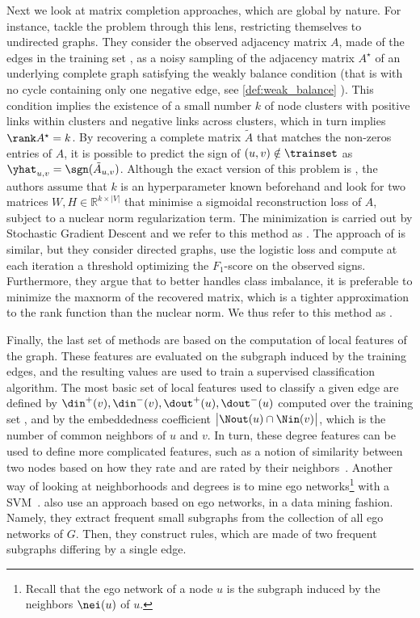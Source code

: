 \begin{newcontent}
Next we look at matrix completion approaches, which are global by nature.
For instance, \Textcite{LowRankCompletion14} tackle the \esp{} problem through this lens,
restricting themselves to undirected graphs. They consider the
observed adjacency matrix $A$, made of the edges in the training set \trainset{}, as a noisy
sampling of the adjacency matrix $A^\star$ of an underlying complete graph satisfying the weakly
balance condition (that is with no cycle containing only one negative edge, see
\autoref{def:weak_balance} ).
This condition implies the existence of a small number $k$ of node clusters with positive links
within clusters and negative links across clusters, which in turn implies $\rank A^\star=k$.  By
recovering a complete matrix $\tilde{A}$ that matches the non-zeros entries of $A$, it is possible
to predict the sign of $(u,v) \notin \trainset$ as $\yhat_{u,v} = \sgn(\tilde{A}_{u,v})$. Although
the exact version of this problem is \NPh{}, the authors assume that $k$ is an hyperparameter known
beforehand and look for two matrices $W,H\in \mathbb{R}^{k\times|V|}$ that minimise a sigmoidal
reconstruction loss of $A$, subject to a nuclear norm regularization term. The minimization is
carried out by Stochastic Gradient Descent and we refer to this method as \emph{\complowrank{}}.
The approach of \textcite{OnlineCompletion17} is similar, but they consider directed graphs, use the
logistic loss and compute at each iteration a threshold optimizing the $F_1$-score on the observed
signs. Furthermore, they argue that to better handles class imbalance, it is preferable to minimize
the maxnorm of the recovered matrix, which is a tighter approximation to the rank function than the
nuclear norm. We thus refer to this method as \compmaxnorm{}.

\medskip

Finally, the last set of methods
are based on the computation of local features of the graph. These features are
evaluated on the subgraph induced by the training edges, and the resulting values are used to train
a supervised classification algorithm. The most basic set of local
features used to classify a given edge \euv{} are defined by
$\din^+(v),\din^-(v),\dout^+(u),\dout^-(u)$ computed over the training set \trainset{}, and by the
embeddedness coefficient $\big|\Nout(u) \cap \Nin(v)\big|$, which is the number of
common neighbors of $u$ and $v$. In turn, these degree features can be used to define more
complicated features, such as a notion of similarity between two nodes based on how they rate and
are rated by their neighbors~\autocite{Yuan2017}.
Another way of looking at neighborhoods and degrees is to mine ego networks\footnote{Recall that the
ego network of a node $u$ is the subgraph induced by the neighbors $\nei(u)$ of $u$.} with a
SVM~\autocite{Papaoikonomou2014}. \Textcite{Bachi2012} also use an approach based on ego networks,
in a data mining fashion. Namely, they extract frequent small subgraphs from the collection of all
ego networks of $G$. Then, they construct rules, which are made of two frequent subgraphs differing
by a single edge.


\end{newcontent}
